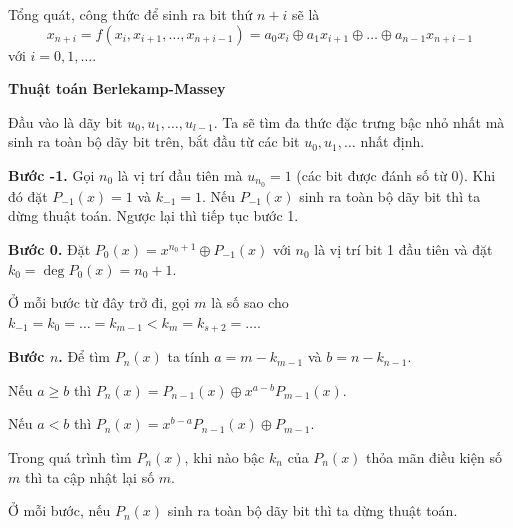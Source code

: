 Tổng quát, công thức để sinh ra bit thứ $n+i$ sẽ là
\begin{equation*}
	x_{n+i} = f(x_i, x_{i+1}, \ldots, x_{n+i-1}) = a_0 x_i \oplus a_1 x_{i+1} \oplus \ldots \oplus a_{n-1} x_{n+i-1} 
\end{equation*}
với $i=0, 1, \ldots$.

\textbf{Thuật toán Berlekamp-Massey}

Đầu vào là dãy bit $u_0, u_1, \ldots, u_{l-1}$. Ta sẽ tìm đa thức đặc trưng bậc nhỏ nhất mà sinh ra toàn bộ dãy bit trên, bắt đầu từ các bit $u_0, u_1, \ldots$ nhất định.

\textbf{Bước -1.} Gọi $n_0$ là vị trí đầu tiên mà $u_{n_0} = 1$ (các bit được đánh số từ 0). Khi đó đặt $P_{-1}(x) = 1$ và $k_{-1} = 1$. Nếu $P_{-1}(x)$ sinh ra toàn bộ dãy bit thì ta dừng thuật toán. Ngược lại thì tiếp tục bước 1.

\textbf{Bước 0.} Đặt $P_0(x) = x^{n_0 + 1} \oplus P_{-1}(x)$ với $n_0$ là vị trí bit 1 đầu tiên và đặt $k_0 = \deg P_0(x) = n_0 + 1$.

Ở mỗi bước từ đây trở đi, gọi $m$ là số sao cho $k_{-1} = k_0 = \ldots = k_{m-1} < k_{m} = k_{s+2} = \ldots$.

\textbf{Bước $n$.} Để tìm $P_n(x)$ ta tính $a = m - k_{m-1}$ và $b = n - k_{n-1}$.

Nếu $a \geqslant b$ thì $P_n(x) = P_{n-1}(x) \oplus x^{a-b} P_{m-1}(x)$.

Nếu $a < b$ thì $P_n(x) = x^{b-a} P_{n-1}(x) \oplus P_{m-1}$.

Trong quá trình tìm $P_n(x)$, khi nào bậc $k_n$ của $P_n(x)$ thỏa mãn điều kiện số $m$ thì ta cập nhật lại số $m$.

Ở mỗi bước, nếu $P_n(x)$ sinh ra toàn bộ dãy bit thì ta dừng thuật toán.

